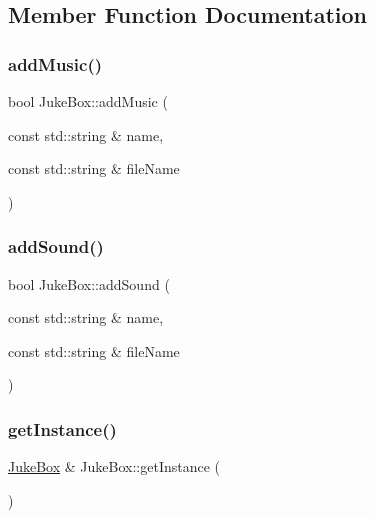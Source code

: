 \subsection{Member Function Documentation}
\mbox{\label{class_juke_box_aea5ad553ffb92d934213501929e653a2}} 
\subsubsection{\texorpdfstring{addMusic()}{addMusic()}}
{\footnotesize\ttfamily bool Juke\+Box\+::add\+Music (\begin{DoxyParamCaption}\item[{const std\+::string \&}]{name,  }\item[{const std\+::string \&}]{file\+Name }\end{DoxyParamCaption})}

\mbox{\label{class_juke_box_a889972d76d4c3363d072fd4f66ced001}} 
\subsubsection{\texorpdfstring{addSound()}{addSound()}}
{\footnotesize\ttfamily bool Juke\+Box\+::add\+Sound (\begin{DoxyParamCaption}\item[{const std\+::string \&}]{name,  }\item[{const std\+::string \&}]{file\+Name }\end{DoxyParamCaption})}

\mbox{\label{class_juke_box_a11fd5183a9697afbdfa4972cc86d5fda}} 
\subsubsection{\texorpdfstring{getInstance()}{getInstance()}}
{\footnotesize\ttfamily \mbox{\hyperlink{class_juke_box}{Juke\+Box}} \& Juke\+Box\+::get\+Instance (\begin{DoxyParamCaption}{ }\end{DoxyParamCaption})\hspace{0.3cm}{\ttfamily [static]}}

